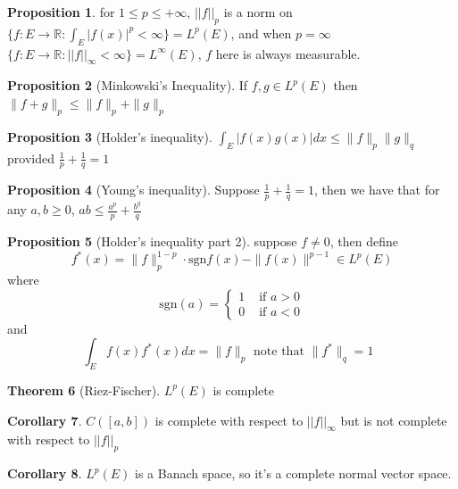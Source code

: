 \documentclass[13pt]{article}
\theoremstyle{definition} --- default
\newtheorem{theorem}{Theorem}
\newtheorem{corollary}[theorem]{Corollary}
\newtheorem{proposition}[theorem]{Proposition}
\theoremstyle{definition}
\theoremstyle{remark}
\begin{document}
	\begin{proposition}
		for $1 \leq p \leq +\infty$, $||f||_p$ is a norm on $\{f \colon E \to \mathbb{R} \colon \int_{E} |f(x)|^p < \infty\} = L^p (E)$, and when  $p = \infty$ $\{f \colon E \to \mathbb{R}  \colon ||f||_\infty < \infty\} = L^\infty (E)$, $f$ here is always measurable.

	\end{proposition}
	\begin{proposition}[Minkowski's Inequality]
		If $f,g \in L^p(E)$ then $\|f+g\|_p \leq \|f\|_p + \|g\|_p$
	\end{proposition}
	\begin{proposition}[Holder's inequality]
		$\int_E |f(x)g(x)|dx \leq \|f\|_p \|g\|_q $ provided $\frac{1}{p} + \frac{1}{q} = 1$
	\end{proposition}
	\begin{proposition}[Young's inequality]
		Suppose $\frac{1}{p} + \frac{1}{q} = 1$, then we have that for any $a,b \geq 0$, $ab \leq \frac{a^p}{p} + \frac{b^q}{q}$ 
	\end{proposition}
	\begin{proposition}[Holder's inequality part 2]
		suppose $f \neq 0$, then define 
		$$f^*(x) = \|f\|_p^{1-p} \cdot \text{sgn}f(x) - \|f(x)\|^{p-1} \in L^p(E)$$ 
		where 
		$$\text{sgn}(a) = 
		\begin{cases} 
		1 & \text{ if $a > 0$} \\
		0 & \text{ if $a < 0$}
		\end{cases}
		$$
		and 
		$$
			\int_E f(x)f^*(x)dx = \|f\|_p \text{ note that  $\|f^*\|_q = 1$ } 
		$$
		
																
	\end{proposition}
	\begin{theorem}[Riez-Fischer]
		\label{thm:12}
		$L^p(E)$ is complete 
	\end{theorem} 
	\begin{corollary}
		$C([a,b])$ is complete with respect to $||f||_\infty$ but is not complete with respect to $||f||_p$
	\end{corollary}
	\begin{corollary}
		$L^p(E)$ is a Banach space, so it's a complete normal vector space. 
	\end{corollary}
\end{document}
